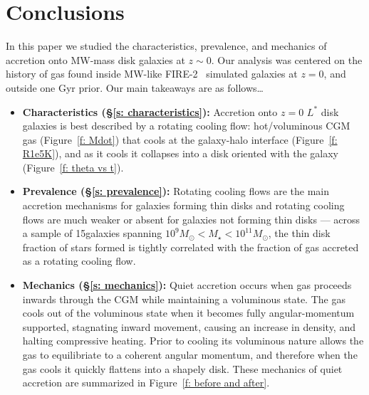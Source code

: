 \documentclass[fleqn,usenatbib]{mnras}
\newcommand{\Nsample}{15}
\begin{document}

\section{Conclusions}
\label{s: conclusions}

In this paper we studied the characteristics, prevalence, and mechanics of accretion onto MW-mass disk galaxies at $z \sim 0$.
Our analysis was centered on the history of gas found inside MW-like FIRE-2~\citep{Hopkins2018} simulated galaxies at $z=0$, and outside one Gyr prior.
Our main takeaways are as follows\ldots
\begin{itemize}
    \item \textbf{Characteristics (\S\ref{s: characteristics}):}
    Accretion onto $z=0$ $L^*$ disk galaxies is best described by a rotating cooling flow:
    hot/voluminous CGM gas (Figure~\ref{f: Mdot}) that cools at the galaxy-halo interface (Figure~\ref{f: R1e5K}), and as it cools it collapses into a disk oriented with the galaxy (Figure~\ref{f: theta vs t}).
    \item \textbf{Prevalence (\S\ref{s: prevalence}):}
    Rotating cooling flows are the main accretion mechanisms for galaxies forming thin disks and rotating cooling flows are much weaker or absent for galaxies not forming thin disks ---
    across a sample of \Nsample galaxies spanning $10^9 M_\odot < M_\star < 10^11 M_\odot$, the thin disk fraction of stars formed is tightly correlated with the fraction of gas accreted as a rotating cooling flow.
    \item \textbf{Mechanics (\S\ref{s: mechanics}):}
    Quiet accretion occurs when gas proceeds inwards through the CGM while maintaining a voluminous state.
    The gas cools out of the voluminous state when it becomes fully angular-momentum supported, stagnating inward movement, causing an increase in density, and halting compressive heating.
    Prior to cooling its voluminous nature allows the gas to equilibriate to a coherent angular momentum, and therefore when the gas cools it quickly flattens into a shapely disk.
    These mechanics of quiet accretion are summarized in Figure~\ref{f: before and after}.
\end{itemize}
\end{document}
